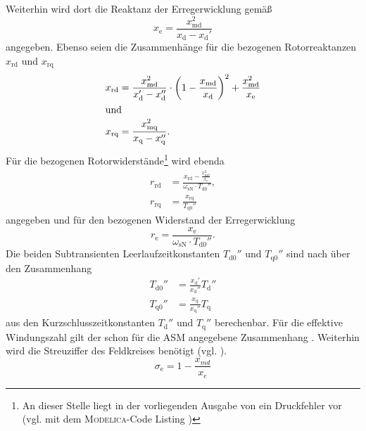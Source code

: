 Weiterhin wird dort die Reaktanz der Erregerwicklung gemäß
\begin{equation}
    x_{\mathrm{e}} = \frac{x_{\mathrm{md}}^2}{x_{\mathrm{d}}-x_{\mathrm{d}}'}
\end{equation}
angegeben. Ebenso seien die Zusammenhänge für die bezogenen Rotorreaktanzen \(x_{\mathrm{rd}}\) und \(x_{\mathrm{rq}}\)
\begin{align}
    x_{\mathrm{rd}} &= \frac{x_{\mathrm{md}}^2}{x_{\mathrm{d}}' - x_{\mathrm{d}}''}\cdot \left( 1-\frac{x_{\mathrm{md}}}{x_{\mathrm{d}}}\right)^2 + \frac{x_{\mathrm{md}}^2}{x_{\mathrm{e}}}\\
    \intertext{und}
    x_{\mathrm{rq}} &= \frac{x_{\mathrm{mq}}^2}{x_{\mathrm{q}} - x_{\mathrm{q}}''}.
\end{align}
Für die bezogenen Rotorwiderstände\footnote{An dieser Stelle liegt in der vorliegenden Ausgabe von \cite[S.~264]{kralModelicaObjektorientierteModellbildung2019} ein Druckfehler vor (vgl. mit dem \textsc{Modelica}-Code Listing \cite[S. 266]{kralModelicaObjektorientierteModellbildung2019})} wird ebenda
\begin{align}
    r_{\mathrm{rd}} &= \frac{x_{\mathrm{rd}} - \frac{x_{\mathrm{md}}^2}{x_{\mathrm{e}}}}{\omega_{\mathrm{sN}}\cdot T_{\mathrm{d0}}''}, \\
    r_{\mathrm{rq}} &= \frac{x_{\mathrm{rq}}}{T_{\mathrm{q0}}''}
\end{align}
angegeben und für den bezogenen Widerstand der Erregerwicklung
\begin{equation}
    r_{\mathrm{e}} = \frac{x_{\mathrm{e}}}{\omega_{\mathrm{sN}}\cdot T_{\mathrm{d0}}''}.
\end{equation}
Die beiden Subtransienten Leerlaufzeitkonstanten \(T_{\mathrm{d0}}''\)
und \(T_{\mathrm{q0}}''\) sind nach
\cite[S. 222ff.]{bonfertBetriebsverhaltenSynchronmaschine1962} über den Zusammenhang
\begin{align}
T_{\mathrm{d0}}'' &= \frac{x_{\mathrm{d}}'}{x_{\mathrm{d}}''}T_{\mathrm{d}}'' \\
T_{\mathrm{q0}}'' &= \frac{x_{\mathrm{q}}}{x_{\mathrm{q}}''}T_{\mathrm{q}}
\end{align}
aus den Kurzschlusszeitkonstanten \(T_{\mathrm{d}}''\) und \(T_{\mathrm{q}}''\) berechenbar. Für die effektive Windungszahl gilt der schon für die ASM angegebene Zusammenhang .
Weiterhin wird die Streuziffer des Feldkreises benötigt (vgl. \cite[S.~267]{kralModelicaObjektorientierteModellbildung2019}).
\begin{equation}
	\sigma_\mathrm{e} = 1-\frac{x_{md}}{x_e}
\end{equation}

